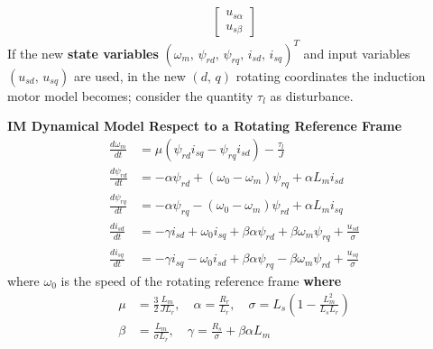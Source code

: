 \documentclass[12pt,a4paper,oneside]{book}
\begin{document}
\begin{onehalfspace}
\begin{equation}
\begin{aligned}
		\left[
		\begin{matrix}
			u_{s\alpha} \\[6pt]
			u_{s\beta}
		\end{matrix}
		\right]
	\end{aligned}
\end{equation}
If the new \textbf{state variables} 
$(\omega_m,\,\psi_{rd},\,\psi_{rq},\,i_{sd},\,i_{sq})^T$ and input variables 
$(u_{sd},\,u_{sq})$ are used, in the new $(d,\,q)$ rotating coordinates the 
induction motor model becomes; consider the quantity $\tau_l$ as disturbance.
\begin{mybox}
	\textbf{IM Dynamical Model Respect to a Rotating Reference Frame}
	\begin{equation}\label{im_eq_41}
		\begin{aligned}
			\frac{d\omega_m}{dt} &= \mu \left(\psi_{rd}i_{sq} - 
			\psi_{rq}i_{sd}\right)-\frac{\tau_l}{J} \\[6pt]
			\frac{d\psi_{rd}}{dt} &= -\alpha \psi_{rd} 
			+\left(\omega_0-\omega_m\right) \psi_{rq}+ \alpha L_m i_{sd} \\[6pt]
			\frac{d\psi_{rq}}{dt} &= -\alpha 
			\psi_{rq}-\left(\omega_0-\omega_m\right) \psi_{rd}+\alpha L_m 
			i_{sq} \\[6pt]
			\frac{di_{sd}}{dt} &= -\gamma i_{sd}  + \omega_0 i_{sq} + 
			\beta\alpha\psi_{rd}+\beta\omega_m\psi_{rq} + \frac{u_{sd}}{\sigma} 
			\\[6pt]
			\frac{di_{sq}}{dt} &= -\gamma i_{sq}  - \omega_0 i_{sd} + 
			\beta\alpha\psi_{rq}-\beta\omega_m\psi_{rd} + \frac{u_{sq}}{\sigma}
		\end{aligned}
	\end{equation}
	where $\omega_0$ is the speed of the rotating reference frame
	\textbf{where}
	\begin{equation}\label{im_eq_42}
		\begin{aligned}
			\mu & = \frac{3}{2}\frac{L_m}{JL_r}, \quad
			\alpha = \frac{R_r}{L_r},  \quad
			\sigma = L_s \left(1-\frac{L_m^2}{L_sL_r}\right) \\[6pt]
			\beta & = \frac{L_m}{\sigma L_r},  \quad
			\gamma = \frac{R_s}{\sigma} + \beta \alpha L_m
		\end{aligned}
	\end{equation}
\end{mybox}


\end{onehalfspace}
\end{document}
